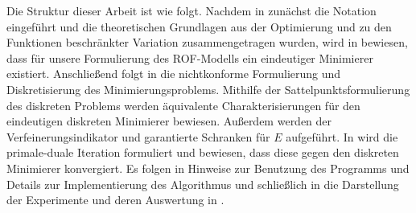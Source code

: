 Die Struktur dieser Arbeit ist wie folgt.
Nachdem in  zunächst die Notation eingeführt und
die theoretischen Grundlagen aus der Optimierung und zu den Funktionen
beschränkter Variation zusammengetragen wurden, wird in
 bewiesen, dass für unsere Formulierung des
ROF-Modells ein eindeutiger Minimierer existiert.
Anschließend folgt in  die nichtkonforme
Formulierung und Diskretisierung des Minimierungsproblems. 
Mithilfe der Sattelpunktsformulierung des diskreten Problems werden äquivalente
Charakterisierungen für den eindeutigen diskreten Minimierer bewiesen. 
Außerdem werden der Verfeinerungsindikator und garantierte Schranken für $E$
aufgeführt.
In  wird die primale-duale Iteration formuliert und
bewiesen, dass diese gegen den diskreten Minimierer konvergiert. 
Es folgen in  Hinweise zur Benutzung des Programms
und Details zur Implementierung des Algorithmus und schließlich in
 die Darstellung der Experimente und deren Auswertung in
.

